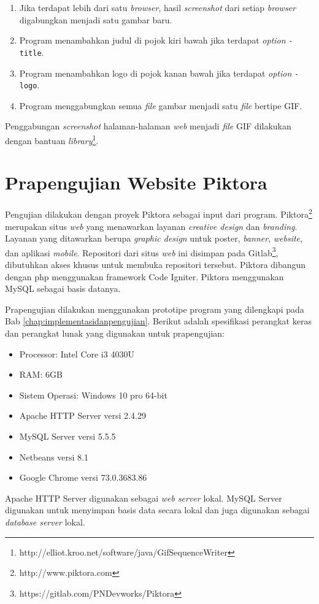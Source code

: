 \begin{enumerate}
\item Jika terdapat lebih dari satu \textit{browser}, hasil \textit{screenshot} dari setiap \textit{browser} digabungkan menjadi satu gambar baru. 
\item Program menambahkan judul di pojok kiri bawah jika terdapat \textit{option} \texttt{-title}.
\item Program menambahkan logo di pojok kanan bawah jika terdapat \textit{option} \texttt{-logo}.  
\item Program menggabungkan semua \textit{file} gambar menjadi satu \textit{file} bertipe GIF.
\end{enumerate}

Penggabungan \textit{screenshot} halaman-halaman \textit{web} menjadi \textit{file} GIF dilakukan dengan bantuan \textit{library}\footnote{http://elliot.kroo.net/software/java/GifSequenceWriter}.


\section{Prapengujian Website Piktora}
\label{sec:prapengujian}
Pengujian dilakukan dengan proyek Piktora sebagai input dari program. Piktora\footnote{http://www.piktora.com} merupakan situs \textit{web} yang menawarkan layanan  \textit{creative design} dan \textit{branding}. Layanan yang ditawarkan berupa \textit{graphic design} untuk poster, \textit{banner}, \textit{website}, dan aplikasi \textit{mobile}. Repositori dari situs \textit{web} ini disimpan pada Gitlab\footnote{https://gitlab.com/PNDevworks/Piktora}, dibutuhkan akses khusus untuk membuka repositori tersebut. Piktora dibangun dengan php  menggunakan framework Code Igniter. Piktora menggunakan MySQL sebagai basis datanya. 

Prapengujian dilakukan menggunakan prototipe program yang dilengkapi pada Bab \ref{chap:implementasidanpengujian}. Berikut adalah spesifikasi perangkat keras dan perangkat lunak yang digunakan untuk prapengujian:
\begin{itemize}
\item Processor: Intel Core i3 4030U
\item RAM: 6GB
\item Sistem Operasi: Windows 10 pro 64-bit
\item Apache HTTP Server versi 2.4.29
\item MySQL Server versi 5.5.5
\item Netbeans versi 8.1
\item Google Chrome versi 73.0.3683.86
\end{itemize}
Apache HTTP Server digunakan sebagai \textit{web server} lokal. MySQL Server digunakan untuk menyimpan basis data secara lokal dan juga digunakan sebagai \textit{database server} lokal. 

